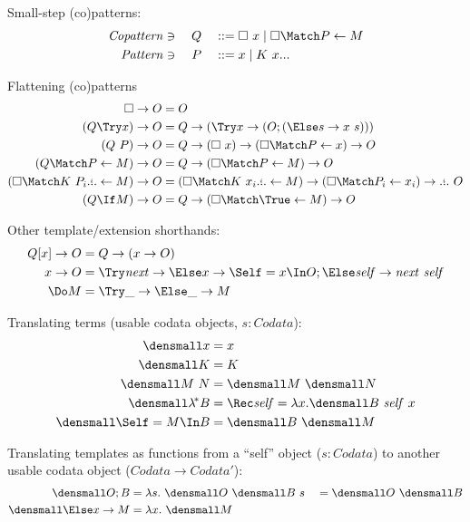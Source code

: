 \documentclass[runningheads]{llncs}
\begin{document}
Small-step (co)patterns:
\begin{alignat*}{3}
  \mathit{Copattern} &\ni{}& Q &&
  &::= \hole ~ x
  \mid \hole \Match P \gets M
  \\
  \mathit{Pattern} &\ni{}& P &&
  &::= x
  \mid K ~ \many{x}
\end{alignat*}

Flattening (co)patterns
\begin{align*}
  \hole \to O &= O \\
  (Q \Try x) \to O &= Q \to (\Try x \to (O; (\Else s \to x~s))) \\
  (Q ~ P) \to O &= Q \to (\hole ~ x) \to (\hole \Match P \gets x) \to O \\
  (Q \Match P \gets M) \to O &= Q \to (\hole \Match P \gets M) \to O \\
  (\hole \Match K~\many[i]{P_i} \gets M) \to O
  &=
  (\hole \Match K~\many[i]{x_i} \gets M) \to
  \many[i]{(\hole \Match P_i \gets x_i) \to}~
  O
  \\
  (Q \If M) \to O &= Q \to (\hole \Match \True \gets M) \to O
\end{align*}

Other template/extension shorthands:
\begin{align*}
  Q[x] \to O
  &=
  Q \to (x \to O)
  \\
  x \to O
  &=
  \Try \mathit{next} \to
  \Else x \to
  \Self = x \In
  O; \Else \mathit{self} \to \mathit{next} ~ \mathit{self}
  \\
  \Do M &= \Try \_ \to \Else \_ \to M
\end{align*}


Translating terms (\eg usable codata objects, $s : Codata$):
\begin{align*}
  \den{x} &= x
  \\
  \den{K} &= K
  \\
  \den{M~N} &= \den{M} ~ \den{N}
  \\
  \den{\lamstar B}
  &=
  \Rec \mathit{self} = \lambda x. \den{B}~\mathit{self}~x
  \\
  \den{\Self = M \In B}
  &=
  \den{B} ~ \den{M}
\end{align*}

Translating templates as functions from a ``self'' object ($s : Codata$) to
another usable codata object ($Codata \to Codata'$):
\begin{align*}
  \den{O; B}
  &=
  \lambda s.~ \den{O} ~ \den{B} ~ s
  &
  &=
  \den{O} ~ \den{B}
  \\
  \den{\Else x \to M}
  &=
  \lambda x.~ \den{M}
\end{align*}
\end{document}
